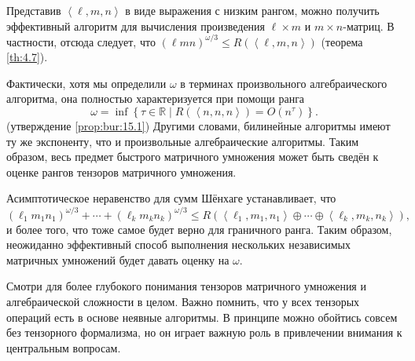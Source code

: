 Представив $\left\langle \ell,m,n \right\rangle$ в виде выражения с низким рангом, можно получить эффективный алгоритм для вычисления произведения $\ell \times m$ и $m \times n$-матриц. В частности, отсюда следует, что $(\ell m n)^{\omega/3} \leq R(\left\langle \ell, m, n \right\rangle)$ (теорема \ref{th:4.7}).

Фактически, хотя мы определили $\omega$ в терминах произвольного алгебраического алгоритма, она полностью характеризуется при помощи ранга
\[
	\omega = \inf \left\{ \tau \in \mathbb{R} \mid R(\left\langle n,n,n \right\rangle) = O(n^\tau) \right\}.
\]
(утверждение \ref{prop:bur:15.1}) Другими словами, билинейные алгоритмы имеют ту же экспоненту, что и произвольные алгебраические алгоритмы. Таким образом, весь предмет быстрого матричного умножения может быть сведён к оценке рангов тензоров матричного умножения.

Асимптотическое неравенство для сумм Шёнхаге \cite{Schonhage81} устанавливает, что
\begin{equation}\label{eq:12:2.1}
  (\ell_1 m_1 n_1)^{\omega/3} + \dotsb + (\ell_k m_k n_k)^{\omega/3} \leq R(\left\langle \ell_1, m_1, n_1 \right\rangle \oplus \dotsb \oplus \left\langle \ell_k, m_k, n_k \right\rangle),
\end{equation}
и более того, что тоже самое будет верно для граничного ранга. Таким образом, неожиданно эффективный способ выполнения нескольких независимых матричных умножений будет давать оценку на $\omega$.

Смотри \cite{bur} для более глубокого понимания тензоров матричного умножения и алгебраической сложности в целом. Важно помнить, что у всех тензорых операций есть в основе неявные алгоритмы. В принципе можно обойтись совсем без тензорного формализма, но он играет важную роль в привлечении внимания к центральным вопросам.
